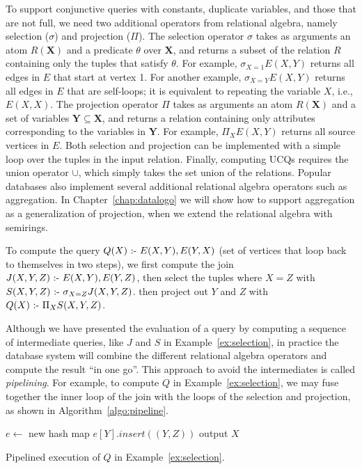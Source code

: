 To support conjunctive queries with constants, 
 duplicate variables, and those that are not full,
 we need two additional operators from relational algebra, 
 namely selection ($\sigma$) and projection ($\Pi$).
The selection operator $\sigma$ takes as arguments an atom $R({\bm X})$
 and a predicate $\theta$ over ${\bm X}$,
 and returns a subset of the relation $R$ containing only the tuples that satisfy $\theta$.
For example, $\sigma_{X = 1}E(X, Y)$ returns all edges in $E$ that start at vertex 1.
For another example, $\sigma_{X = Y}E(X, Y)$ returns all edges in $E$ that are self-loops;
 it is equivalent to repeating the variable $X$, i.e., $E(X, X)$.
The projection operator $\Pi$ takes as arguments an atom $R({\bm X})$
 and a set of variables ${\bm Y} \subseteq {\bm X}$,
 and returns a relation containing only attributes corresponding 
 to the variables in ${\bm Y}$.
For example, $\Pi_{X}E(X, Y)$ returns all source vertices in $E$.
Both selection and projection can be implemented with a simple loop over the tuples in the input relation.
Finally, computing UCQs requires the union operator $\cup$,
 which simply takes the set union of the relations.
Popular databases also implement several additional relational algebra operators 
 such as aggregation.
In Chapter~\ref{chap:datalogo} we will show how to support aggregation
 as a generalization of projection, 
 when we extend the relational algebra with semirings.

\begin{ex}
\label{ex:selection}
To compute the query $Q(X) \text{ :- } E(X, Y), E(Y, X)$ 
 (set of vertices that loop back to themselves in two steps),
 we first compute the join $J(X, Y, Z) \text{ :- } E(X, Y), E(Y, Z)$, 
 then select the tuples where $X = Z$ with $S(X, Y, Z) \text{ :- } \sigma_{X=Z} J(X, Y, Z)$.
 then project out $Y$ and $Z$ with $Q(X) \text{ :- } \Pi_{X} S(X, Y, Z)$.
\end{ex}
 
Although we have presented the evaluation of a query 
 by computing a sequence of intermediate queries, 
 like $J$ and $S$ in Example~\ref{ex:selection},
 in practice the database system will combine
 the different relational algebra operators 
 and compute the result ``in one go''.
This approach to avoid the intermediates 
 is called {\em pipelining}.
For example, to compute $Q$ in Example~\ref{ex:selection},
 we may fuse together the inner loop of the join
 with the loops of the selection and projection, 
 as shown in Algorithm~\ref{algo:pipeline}.

\begin{algorithm}
$e \gets $ new hash map \;
{
    $e[Y].insert((Y, Z))$\;
}
{
    {
        {
            output $X$\;
        }
    }
}
\caption{Pipelined execution of $Q$ in Example~\ref{ex:selection}.}
\label{algo:pipeline} 
\end{algorithm}


